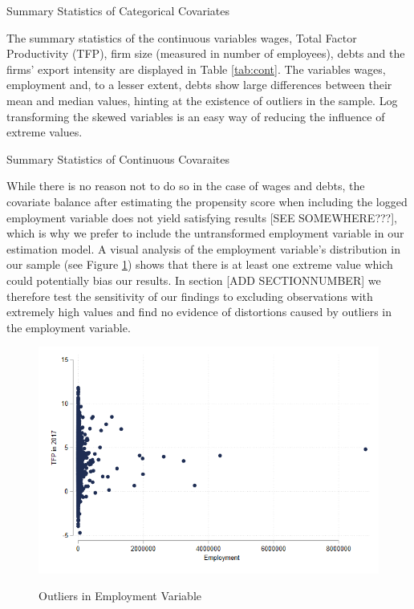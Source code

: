 \documentclass[a4paper,11pt]{scrartcl}
\begin{document}
\begin{table}[h]
	\centering
	\caption{Summary Statistics of Categorical Covariates} 
	
	\label{tab:cat}	
\end{table}

The summary statistics of the continuous variables wages, Total Factor Productivity (TFP), firm size (measured in number of employees), debts and the firms' export intensity are displayed in Table \ref{tab:cont}. The variables wages, employment and, to a lesser extent, debts show large differences between their mean and median values, hinting at the existence of outliers in the sample. Log transforming the skewed variables is an easy way of reducing the influence of extreme values. 

\begin{table}[h]
	\centering
	\caption{Summary Statistics of Continuous Covaraites} 
	
	\label{tab:cont}
\end{table}

While there is no reason not to do so in the case of wages and debts, the covariate balance after estimating the propensity score when including the logged employment variable does not yield satisfying results [SEE SOMEWHERE???], which is why we prefer to include the untransformed employment variable in our estimation model. A visual analysis of the employment variable's distribution in our sample (see Figure \ref{fig:outliers}) shows that there is at least one extreme value which could potentially bias our results. In section [ADD SECTIONNUMBER] we therefore test the sensitivity of our findings to excluding observations with extremely high values and find no evidence of distortions caused by outliers in the employment variable. 

\begin{figure}[h]\centering
	\caption{Outliers in Employment Variable}
	\includegraphics[width=\textwidth]{emp15_outliers}
  	\label{fig:outliers}
\end{figure} 
\end{document}
